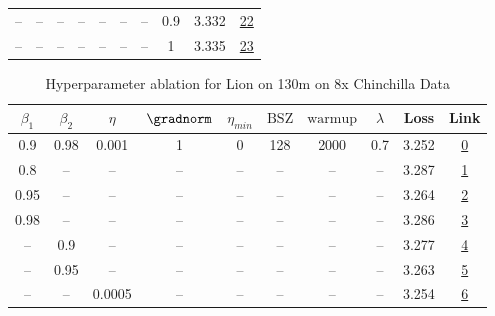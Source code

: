 \begin{table}[H]
\begin{tabular}{cccccccccc}
-- & -- & -- & -- & -- & -- & -- & 0.9 & 3.332 & \href{https://wandb.ai/stanford-mercury/optimizer-scaling/runs/sweep-130m-10B-lionp2d5974lr0.001-wd0.9-minlr0-warmup2000-b10.9--c710cf}{22} \\
-- & -- & -- & -- & -- & -- & -- & 1 & 3.335 & \href{https://wandb.ai/stanford-mercury/optimizer-scaling/runs/sweep-130m-10B-lionp58eb1dlr0.001-wd1-minlr0-warmup2000-b10.9-b2-be93de}{23} \\
\bottomrule
\end{tabular}
\end{table}

\begin{table}[H]
\centering
\caption{Hyperparameter ablation for Lion on 130m on 8x Chinchilla Data}
\label{tab:ablation_lion_130m_on_8x_chinchilla_data}
\begin{tabular}{cccccccccc}
\toprule
$\beta_1$ & $\beta_2$ & $\eta$ & $\gradnorm$ & $\eta_{min}$ & $\mathrm{BSZ}$ & $\mathrm{warmup}$ & $\lambda$ & Loss & Link \\
\midrule
0.9 & 0.98 & 0.001 & 1 & 0 & 128 & 2000 & 0.7 & 3.252 & \href{https://wandb.ai/stanford-mercury/optimizer-scaling/runs/sweep-130m-21B-lion85b813lr0.001-wd0.7-minlr0-warmup2000-b10.9-b-eef545}{0} \\
\midrule
0.8 & -- & -- & -- & -- & -- & -- & -- & 3.287 & \href{https://wandb.ai/stanford-mercury/optimizer-scaling/runs/sweep-130m-21B-lionje7bccblr0.001-wd0.7-minlr0-warmup2000-b10.8--46199a}{1} \\
0.95 & -- & -- & -- & -- & -- & -- & -- & 3.264 & \href{https://wandb.ai/stanford-mercury/optimizer-scaling/runs/sweep-130m-21B-lionjc17beflr0.001-wd0.7-minlr0-warmup2000-b10.95-bd5017}{2} \\
0.98 & -- & -- & -- & -- & -- & -- & -- & 3.286 & \href{https://wandb.ai/stanford-mercury/optimizer-scaling/runs/sweep-130m-21B-liona1354cclr0.001-wd0.7-minlr0-warmup2000-b10.98-b74486}{3} \\
-- & 0.9 & -- & -- & -- & -- & -- & -- & 3.277 & \href{https://wandb.ai/stanford-mercury/optimizer-scaling/runs/sweep-130m-21B-liona9ff1b8lr0.001-wd0.7-minlr0-warmup2000-b10.9--9c346c}{4} \\
-- & 0.95 & -- & -- & -- & -- & -- & -- & 3.263 & \href{https://wandb.ai/stanford-mercury/optimizer-scaling/runs/sweep-130m-21B-lionje4e710lr0.001-wd0.7-minlr0-warmup2000-b10.9--f5263e}{5} \\
-- & -- & 0.0005 & -- & -- & -- & -- & -- & 3.254 & \href{https://wandb.ai/stanford-mercury/optimizer-scaling/runs/sweep-130m-21B-lionja6ac62lr0.0005-wd0.7-minlr0-warmup2000-b10.9-39f7c0}{6} \\

\end{tabular}
\end{table}
